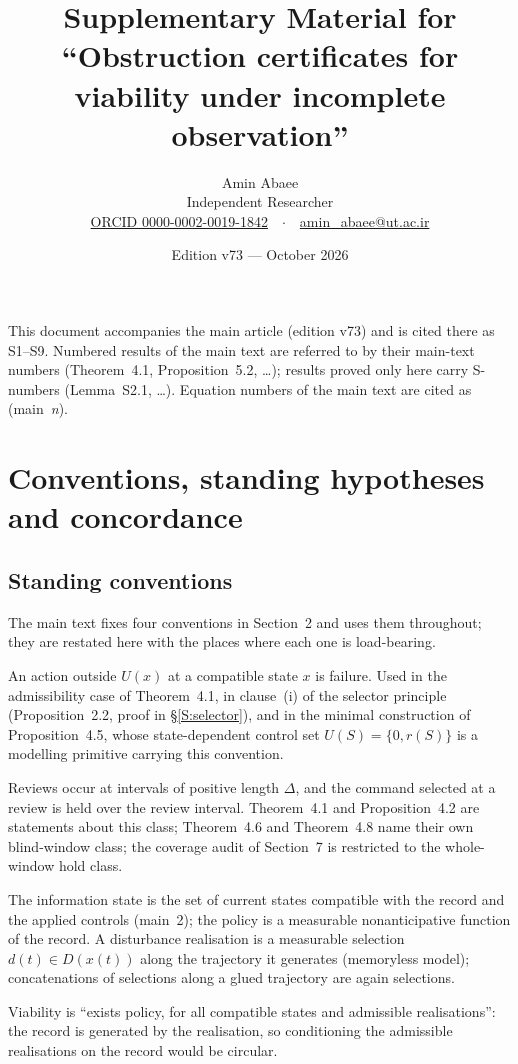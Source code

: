 \documentclass[11pt,a4paper]{article}
\title{\vspace{-1.2em}Supplementary Material for\\``Obstruction certificates for viability under incomplete observation''}
\author{Amin Abaee\\[0.3em]{\normalsize Independent Researcher}\\
{\normalsize \href{https://orcid.org/0000-0002-0019-1842}{ORCID 0000-0002-0019-1842}\ \ $\cdot$\ \ \href{mailto:amin_abaee@ut.ac.ir}{amin\_abaee@ut.ac.ir}}}
\date{Edition v73 --- October 2026}
\theoremstyle{plain}
\theoremstyle{definition}
\theoremstyle{remark}
\begin{document}
\maketitle
\vspace{-1em}
\noindent This document accompanies the main article (edition v73) and is cited there as S1--S9. Numbered results of the main text are referred to by their main-text numbers (Theorem~4.1, Proposition~5.2, \dots); results proved only here carry S-numbers (Lemma~S2.1, \dots). Equation numbers of the main text are cited as (main~\textit{n}).

\tableofcontents
\bigskip
\section{Conventions, standing hypotheses and concordance}\label{S:conventions}

\subsection{Standing conventions}
The main text fixes four conventions in Section~2 and uses them throughout; they are restated here with the places where each one is load-bearing.

\begin{description}[leftmargin=1.6em,itemsep=2pt]
\item[(Fail)] An action outside $U(x)$ at a compatible state $x$ is failure. Used in the admissibility case of Theorem~4.1, in clause~(i) of the selector principle (Proposition~2.2, proof in \S\ref{S:selector}), and in the minimal construction of Proposition~4.5, whose state-dependent control set $U(S)=\{0,r(S)\}$ is a modelling primitive carrying this convention.
\item[(Hold)] Reviews occur at intervals of positive length $\Delta$, and the command selected at a review is held over the review interval. Theorem~4.1 and Proposition~4.2 are statements about this class; Theorem~4.6 and Theorem~4.8 name their own blind-window class; the coverage audit of Section~7 is restricted to the whole-window hold class.
\item[(Record)] The information state is the set of current states compatible with the record and the applied controls (main~2); the policy is a measurable nonanticipative function of the record. A disturbance realisation is a measurable selection $d(t)\in D(x(t))$ along the trajectory it generates (memoryless model); concatenations of selections along a glued trajectory are again selections.
\item[(Order)] Viability is ``exists policy, for all compatible states and admissible realisations'': the record is generated by the realisation, so conditioning the admissible realisations on the record would be circular.
\end{description}
\end{document}
